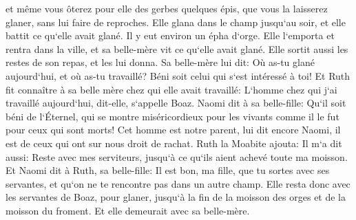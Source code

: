 \verse et même vous ôterez pour elle des gerbes quelques épis, que vous la laisserez glaner, sans lui faire de reproches. 
\verse Elle glana dans le champ jusqu`au soir, et elle battit ce qu`elle avait glané. Il y eut environ un épha d`orge. 
\verse Elle l`emporta et rentra dans la ville, et sa belle-mère vit ce qu`elle avait glané. Elle sortit aussi les restes de son repas, et les lui donna. 
\verse Sa belle-mère lui dit: Où as-tu glané aujourd`hui, et où as-tu travaillé? Béni soit celui qui s`est intéressé à toi! Et Ruth fit connaître à sa belle mère chez qui elle avait travaillé: L`homme chez qui j`ai travaillé aujourd`hui, dit-elle, s`appelle Boaz. 
\verse Naomi dit à sa belle-fille: Qu`il soit béni de l`Éternel, qui se montre miséricordieux pour les vivants comme il le fut pour ceux qui sont morts! Cet homme est notre parent, lui dit encore Naomi, il est de ceux qui ont sur nous droit de rachat. 
\verse Ruth la Moabite ajouta: Il m`a dit aussi: Reste avec mes serviteurs, jusqu`à ce qu`ils aient achevé toute ma moisson. 
\verse Et Naomi dit à Ruth, sa belle-fille: Il est bon, ma fille, que tu sortes avec ses servantes, et qu`on ne te rencontre pas dans un autre champ. 
\verse Elle resta donc avec les servantes de Boaz, pour glaner, jusqu`à la fin de la moisson des orges et de la moisson du froment. Et elle demeurait avec sa belle-mère. 

\chapter{}

